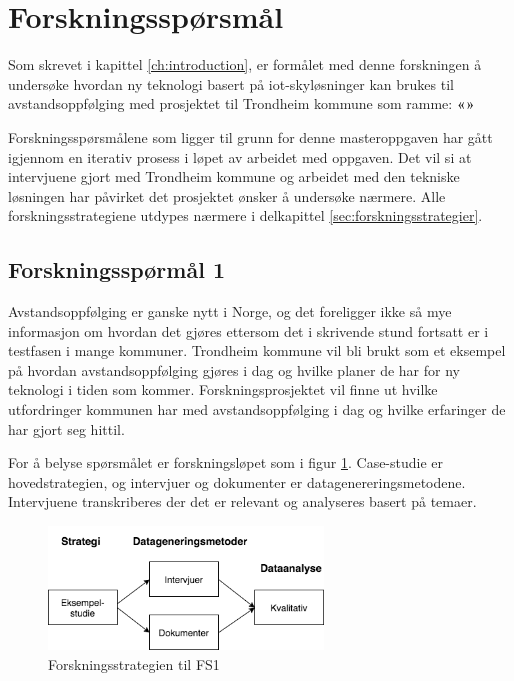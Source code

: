 \section{Forskningsspørsmål}
Som skrevet i kapittel \ref{ch:introduction}, er formålet med denne forskningen å undersøke hvordan ny teknologi basert
på \gls{iot}-skyløsninger kan brukes til avstandsoppfølging med prosjektet til Trondheim kommune som ramme:
\textbf{«\fs{}»}

Forskningsspørsmålene som ligger til grunn for denne masteroppgaven har gått igjennom en iterativ prosess i løpet av arbeidet
med oppgaven. Det vil si at intervjuene gjort med Trondheim kommune og arbeidet med den tekniske løsningen har påvirket
det prosjektet ønsker å undersøke nærmere. Alle forskningsstrategiene utdypes nærmere i delkapittel \ref{sec:forskningsstrategier}.

\subsection{Forskningsspørmål 1}
\textbf{}

Avstandsoppfølging er ganske nytt i Norge, og det foreligger ikke så mye informasjon om hvordan det gjøres ettersom
det i skrivende stund fortsatt er i testfasen i mange kommuner. Trondheim kommune vil bli brukt som et eksempel på hvordan avstandsoppfølging
gjøres i dag og hvilke planer de har for ny teknologi i tiden som kommer. Forskningsprosjektet vil finne ut hvilke utfordringer
kommunen har med avstandsoppfølging i dag og hvilke erfaringer de har gjort seg hittil.

For å belyse spørsmålet er forskningsløpet som i figur \ref{fig:oates_fs1}. Case-studie er hovedstrategien, og intervjuer og dokumenter
er datagenereringsmetodene. Intervjuene transkriberes der det er relevant og analyseres basert på temaer.

\begin{figure}
\centering
\includegraphics[width=0.65\textwidth]{fig/oates/fs1}
\caption{Forskningsstrategien til FS1}
\label{fig:oates_fs1}
\end{figure}

